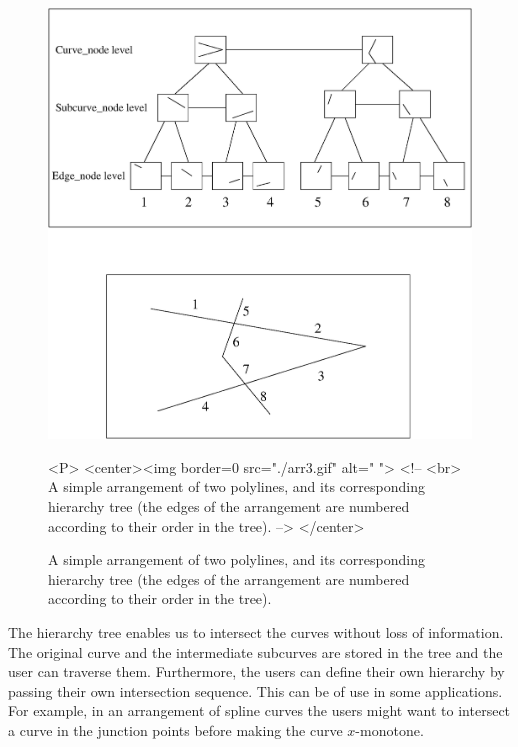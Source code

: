 
\begin{figure}
\begin{ccTexOnly}
{\centering \resizebox*{0.8\textwidth}{0.6\textheight}%
{\includegraphics{arr3.eps}}}
\end{ccTexOnly}
\caption{A simple arrangement of two polylines, and its corresponding
hierarchy tree (the edges of the arrangement are numbered according to
their order in the tree).\label{fig:hierarchy}}
\begin{ccHtmlOnly}
<P>
<center><img border=0 src="./arr3.gif" alt=" ">
<!--
<br>
A simple arrangement of two polylines, and its corresponding hierarchy tree
(the edges of the arrangement are numbered according to their order
in the tree).
-->
</center>
\end{ccHtmlOnly}
\end{figure}


The hierarchy tree enables us to intersect the curves without loss of
information. The original curve and the intermediate subcurves are stored
in the tree and the user can traverse them. Furthermore, the users can
define their own hierarchy by passing their own intersection sequence.
This can be of use in some applications. For example, in an arrangement
of spline curves the users might want to intersect a curve in the
junction points before making the curve $x$-monotone. 

